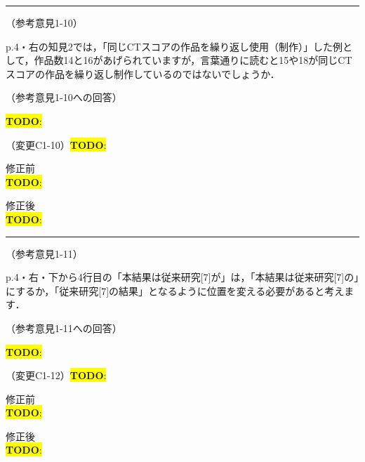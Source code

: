 \documentclass{jarticle} %
\newcommand{\todo}[1]{\colorbox{yellow}{{\bf TODO}:}{\color{blue}{\textbf{[#1]}}}}
\def\subsection#1{ \vspace{1pc} {\gt #1} }
\def\nextans{ \vspace{2pc} \hrule }
\begin{document}
\newpage
\nextans
\subsection{（参考意見1-10）}

p.4・右の知見2では，「同じCTスコアの作品を繰り返し使用（制作）」した例として，作品数14と16があげられていますが，言葉通りに読むと15や18が同じCTスコアの作品を繰り返し制作しているのではないでしょうか．

\subsection{（参考意見1-10への回答）}

\todo{hoge}

\subsection{（変更C1-10）\todo{hoge}}
\vspace{-0.3cm}
\begin{description}
\item 修正前\\
\phantom{　}
\todo{hoge}
\vspace{-0.3cm}
\item 修正後\\
\phantom{　}
\todo{hoge}
\end{description}


\newpage
\nextans
\subsection{（参考意見1-11）}

p.4・右・下から4行目の「本結果は従来研究[7]が」は，「本結果は従来研究[7]の」にするか，「従来研究[7]の結果」となるように位置を変える必要があると考えます．

\subsection{（参考意見1-11への回答）}

\todo{hoge}

\subsection{（変更C1-12）\todo{hoge}}
\vspace{-0.3cm}
\begin{description}
\item 修正前\\
\phantom{　}
\todo{hoge}
\vspace{-0.3cm}
\item 修正後\\
\phantom{　}
\todo{hoge}
\end{description}
\end{document}
